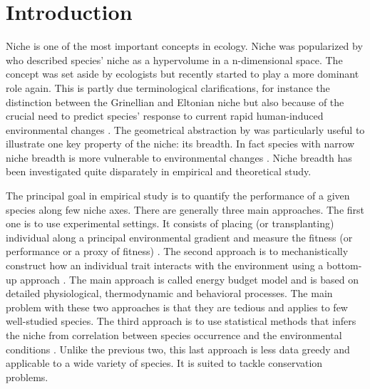 \section*{Introduction}
Niche is one of the most important concepts in ecology.
Niche was popularized by \citet{Hutchinson1957} who described species' niche as a hypervolume in a n-dimensional space.
The concept was set aside by ecologists but recently started to play a more dominant role again.%
This is partly due terminological clarifications, for instance the distinction between the Grinellian and Eltonian niche \citep{Chase2003} but also because of the crucial need to predict species' response to current rapid human-induced environmental changes \citep[e.g.,][]{Parmesan2006, Kearney2009}.
The geometrical abstraction by \citet{Hutchinson1957} was particularly useful to illustrate one key property of the niche: its breadth.
In fact species with narrow niche breadth is more vulnerable to environmental changes \citep{Henle2004}.
Niche breadth has been investigated quite disparately in empirical and theoretical study.

The principal goal in empirical study is to quantify the performance of a given species along few niche axes.
There are generally three main approaches.
The first one is to use experimental settings.
It consists of placing (or transplanting) individual along a principal environmental gradient and measure the fitness (or performance or a proxy of fitness) \citep{Birch1953, Elliott1982, Angert2005, Frazier2006}.
The second approach is to mechanistically construct how an individual trait interacts with the environment using a bottom-up approach \citep{Kooijman2009, Kearney2009, Buckley2008}.%
The main approach is called energy budget model and is based on detailed physiological, thermodynamic and behavioral processes. 
The main problem with these two approaches is that they are tedious and applies to few well-studied species.
The third approach is to use statistical methods that infers the niche from correlation between species occurrence and the environmental conditions \citep{Guisan2005, Austin2007, Elith2009}. %
Unlike the previous two, this last approach is less data greedy and applicable to a wide variety of species.
It is suited to tackle conservation problems.
 
